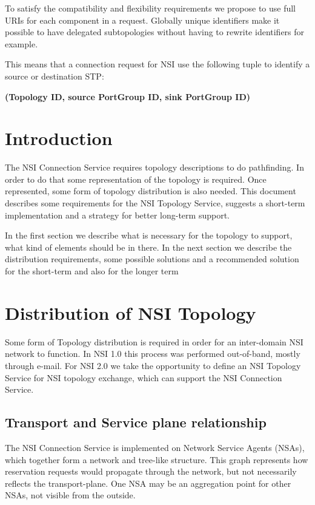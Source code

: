 \documentclass[12pt]{article}  %
\begin{document}
To satisfy the compatibility and flexibility requirements we propose 
to use full URIs for each component in a request. Globally unique identifiers make 
it possible to have delegated subtopologies without having to rewrite identifiers 
for example.

This means that a connection request for NSI \SHOULD{} use the following 
tuple to identify a source or destination STP:

 \textbf{(Topology ID, source PortGroup ID, sink PortGroup ID)}
 
\section{Introduction}

 The NSI Connection Service requires topology descriptions to do 
pathfinding. In order to do that some representation of the topology is required. 
Once represented, some form of topology distribution is also needed. This document 
describes some requirements for the NSI Topology Service, suggests a short-term 
implementation and a strategy for better long-term support.

 In the first section we describe what is necessary for the topology 
to support, what kind of elements should be in there. In the next section we describe 
the distribution requirements, some possible solutions and a recommended solution 
for the short-term and also for the longer term\label{h.15n4tpv97j8w}


\section{Distribution of NSI Topology}

 Some form of Topology distribution is required in order for an 
inter-domain NSI network to function. In NSI 1.0 this process was performed out-of-band, 
mostly through e-mail. For NSI 2.0 we take the opportunity to define an NSI Topology 
Service for NSI topology exchange, which can support the NSI Connection Service.\label{h.c2129mkn366h}


\subsection{Transport and Service plane relationship}

 The NSI Connection Service is implemented on Network Service Agents 
(NSAs), which together form a network and tree-like structure. This graph represents 
how reservation requests would propagate through the network, but not necessarily 
reflects the transport-plane. One NSA may be an aggregation point for other NSAs, 
not visible from the outside.\label{h.mtia1ajwgzmv}
\end{document}
